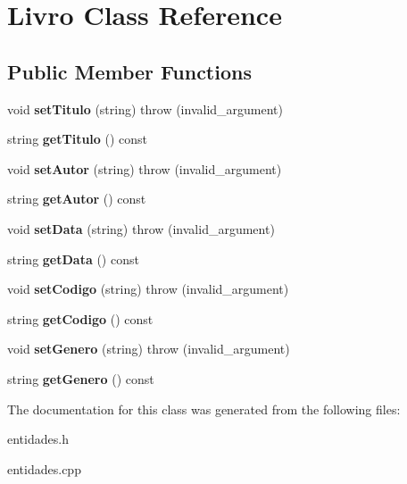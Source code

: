 \hypertarget{classLivro}{}\section{Livro Class Reference}
\label{classLivro}
\subsection*{Public Member Functions}
\begin{DoxyCompactItemize}
\item 
\mbox{\label{classLivro_a9a33b5175b4b8666a3dc3ffbbb445b7e}} 
void {\bfseries set\+Titulo} (string)  throw (invalid\+\_\+argument)
\item 
\mbox{\label{classLivro_a4b4e2e74d4fa1a0e6e9a4d6c05dc3bd4}} 
string {\bfseries get\+Titulo} () const
\item 
\mbox{\label{classLivro_adcc86bd3488de769173fe872c7949077}} 
void {\bfseries set\+Autor} (string)  throw (invalid\+\_\+argument)
\item 
\mbox{\label{classLivro_ae8f2ea7e82a3ddd33e1d0e242c43f3e5}} 
string {\bfseries get\+Autor} () const
\item 
\mbox{\label{classLivro_a3530e8f2974791461f080563fd332fa0}} 
void {\bfseries set\+Data} (string)  throw (invalid\+\_\+argument)
\item 
\mbox{\label{classLivro_aaf7d614049f22c09631bae2a5f83c16a}} 
string {\bfseries get\+Data} () const
\item 
\mbox{\label{classLivro_a30b6c41de98f92185b4a5f33dcdf5a66}} 
void {\bfseries set\+Codigo} (string)  throw (invalid\+\_\+argument)
\item 
\mbox{\label{classLivro_ac0bf6014dae1a0a3cb15ffac8b886f13}} 
string {\bfseries get\+Codigo} () const
\item 
\mbox{\label{classLivro_a780f063297948dfc6c20d564ed4a48c3}} 
void {\bfseries set\+Genero} (string)  throw (invalid\+\_\+argument)
\item 
\mbox{\label{classLivro_a00b6085b059571efab6d29630cf95a50}} 
string {\bfseries get\+Genero} () const
\end{DoxyCompactItemize}


The documentation for this class was generated from the following files\+:\begin{DoxyCompactItemize}
\item 
entidades.\+h\item 
entidades.\+cpp\end{DoxyCompactItemize}
